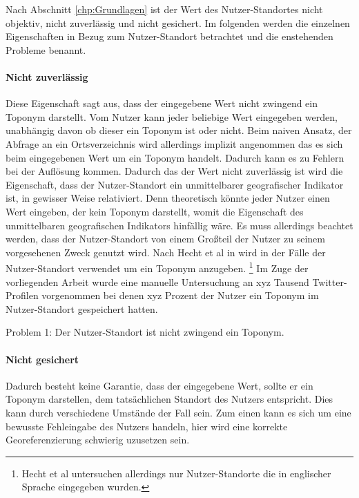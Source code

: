 			Nach Abschnitt \ref{chp:Grundlagen} ist der Wert des Nutzer-Standortes nicht objektiv, nicht zuverlässig und nicht gesichert. 
			Im folgenden werden die einzelnen Eigenschaften in Bezug zum Nutzer-Standort betrachtet und die enstehenden Probleme benannt.
			
			\paragraph{Nicht zuverlässig} 
				
				Diese Eigenschaft sagt aus, dass der eingegebene Wert nicht zwingend ein Toponym darstellt.
				Vom Nutzer kann jeder beliebige Wert eingegeben werden, unabhängig davon ob dieser ein Toponym ist oder nicht.
				Beim naiven Ansatz, der Abfrage an ein Ortsverzeichnis wird allerdings implizit angenommen das es sich beim eingegebenen Wert um ein Toponym handelt.
				Dadurch kann es zu Fehlern bei der Auflösung kommen.
				Dadurch das der Wert nicht zuverlässig ist wird die Eigenschaft, dass der Nutzer-Standort ein unmittelbarer geografischer Indikator ist, in gewisser Weise relativiert.
				Denn theoretisch könnte jeder Nutzer einen Wert eingeben, der kein Toponym darstellt, womit die Eigenschaft des unmittelbaren geografischen Indikators hinfällig wäre.
				Es muss allerdings beachtet werden, dass der Nutzer-Standort von einem Großteil der Nutzer zu seinem vorgesehenen Zweck genutzt wird.
				Nach Hecht et al in \cite{Hecht2011} wird in  der Fälle der Nutzer-Standort verwendet um ein Toponym anzugeben. \footnote{Hecht et al untersuchen allerdings nur Nutzer-Standorte die in englischer Sprache eingegeben wurden.}
				Im Zuge der vorliegenden Arbeit wurde eine manuelle Untersuchung an xyz Tausend Twitter-Profilen vorgenommen bei denen xyz Prozent der Nutzer ein Toponym im Nutzer-Standort gespeichert hatten.   


				Problem 1: Der Nutzer-Standort ist nicht zwingend ein Toponym.

			\paragraph{Nicht gesichert} 

				Dadurch besteht keine Garantie, dass der eingegebene Wert, sollte er ein Toponym darstellen, dem tatsächlichen Standort des Nutzers entspricht. 
				Dies kann durch verschiedene Umstände der Fall sein.
				Zum einen kann es sich um eine bewusste Fehleingabe des Nutzers handeln, hier wird eine korrekte Georeferenzierung schwierig uzusetzen sein.

